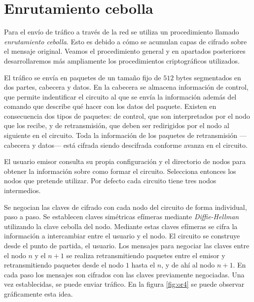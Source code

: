 \documentclass[
  a4paper,
  12pt,
  spanish,
]{scrartcl}
\begin{document}
\section{Enrutamiento cebolla}
\label{sec:enrutamiento}

Para el envío de tráfico a través de la red se utiliza un procedimiento llamado \textit{enrutamiento cebolla}. Esto es debido a cómo se acumulan capas de cifrado sobre el mensaje original. Veamos el procedimiento general y en apartados posteriores desarrollaremos más ampliamente los procedimientos criptográficos utilizados.

El tráfico se envía en paquetes de un tamaño fijo de \(512\) bytes segmentados en dos partes, cabecera y datos. 
En la cabecera se almacena información de control, que permite indentificar el circuito al que se envía la información además del comando que describe qué hacer con los datos del paquete.
Existen en consecuencia dos tipos de paquetes: de control, que son interpretados por el nodo que los recibe, y de retransmisión, que deben ser redirigidos por el nodo al siguiente en el circuito.
Toda la información de los paquetes de retransmisión ---cabecera y datos--- está cifrada siendo descifrada conforme avanza en el circuito.

El usuario emisor consulta su propia configuración y el directorio de nodos para obtener la información sobre como formar el circuito. Selecciona entonces los nodos que pretende utilizar. Por defecto cada circuito tiene tres nodos intermedios.

Se negocian las claves de cifrado con cada nodo del circuito de forma individual, paso a paso. Se establecen claves simétricas efímeras mediante \textit{Diffie-Hellman} utilizando la clave cebolla del nodo. Mediante estas claves efímeras se cifra la información a intercambiar entre el usuario y el nodo. El circuito se construye desde el punto de partida, el usuario. Los mensajes para negociar las claves entre el nodo \(n\) y el \(n+1\) se realiza retransmitiendo paquetes entre el emisor y retransmitiendo paquetes desde el nodo \(1\) hasta el \(n\), y de ahí al nodo \(n+1\). En cada paso los mensajes son cifrados con las claves previamente negociadas. Una vez establecidas, se puede enviar tráfico. En la figura \ref{fig:or4} se puede observar gráficamente esta idea.
\end{document}
